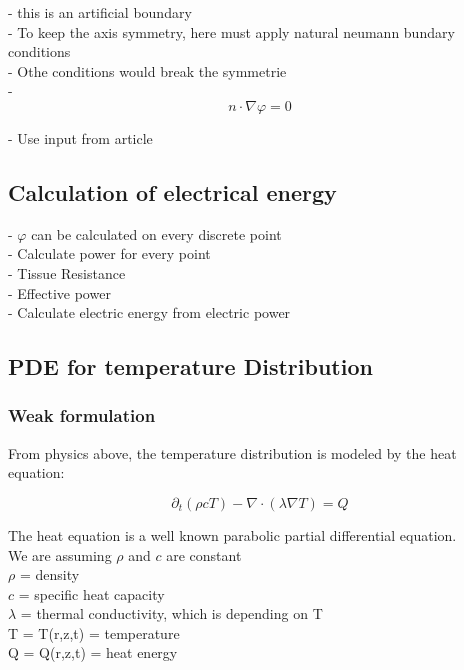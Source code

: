 \documentclass[parskip=half, titlepage=yes, 12pt, BCOR=12mm, DIV=calc]{scrartcl}
\begin{document}
- this is an artificial boundary \\
- To keep the axis symmetry, here must apply natural neumann bundary conditions \\
- Othe conditions would break the symmetrie \\
- \begin{equation}
    n \cdot \nabla \varphi = 0
\end{equation}

- Use input from article \\


\subsection{Calculation of electrical energy}

- $\varphi$ can be calculated on every discrete point \\
- Calculate power for every point \\
- Tissue Resistance \\
- Effective power \\
- Calculate electric energy from electric power \\




\subsection{PDE for temperature Distribution}

\subsubsection{Weak formulation}

From physics above, the temperature distribution is modeled by the heat equation: 

\begin{equation}
    \partial_t (\rho c T) - \nabla \cdot (\lambda \nabla T) = Q
\end{equation}

The heat equation is a well known parabolic partial differential equation. \\

We are assuming $\rho$ and $c$ are constant \\
$\rho$ = density \\
$c$ = specific heat capacity \\
$\lambda$ = thermal conductivity, which is depending on T \\
T = T(r,z,t) = temperature \\
Q = Q(r,z,t) = heat energy \\
\end{document}

